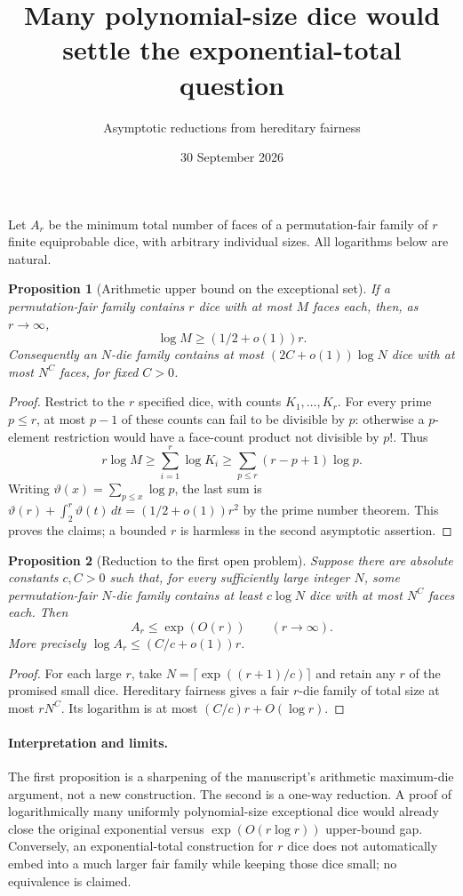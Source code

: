 \documentclass[11pt]{article}
\title{Many polynomial-size dice would settle the exponential-total question}
\author{Asymptotic reductions from hereditary fairness}
\date{30 September 2026}
\newtheorem{proposition}{Proposition}
\begin{document}
\maketitle
Let $A_r$ be the minimum total number of faces of a permutation-fair
family of $r$ finite equiprobable dice, with arbitrary individual sizes.
All logarithms below are natural.

\begin{proposition}[Arithmetic upper bound on the exceptional set]
If a permutation-fair family contains $r$ dice with at most $M$ faces
each, then, as $r\to\infty$,
\[
 \log M\ge(1/2+o(1))r.
\]
Consequently an $N$-die family contains at most
$(2C+o(1))\log N$ dice with at most $N^C$ faces, for fixed $C>0$.
\end{proposition}
\begin{proof}
Restrict to the $r$ specified dice, with counts $K_1,\ldots,K_r$.
For every prime $p\le r$, at most $p-1$ of these counts can fail to
be divisible by $p$: otherwise a $p$-element restriction would have
a face-count product not divisible by $p!$. Thus
\[
 r\log M\ge\sum_{i=1}^r\log K_i
 \ge\sum_{p\le r}(r-p+1)\log p.
\]
Writing $\vartheta(x)=\sum_{p\le x}\log p$, the last sum is
$\vartheta(r)+\int_2^r\vartheta(t)\,dt=(1/2+o(1))r^2$
by the prime number theorem. This proves the claims; a bounded $r$
is harmless in the second asymptotic assertion.
\end{proof}

\begin{proposition}[Reduction to the first open problem]\label{reduction}
Suppose there are absolute constants $c,C>0$ such that, for every
sufficiently large integer $N$, some permutation-fair $N$-die family
contains at least $c\log N$ dice with at most $N^C$ faces each.
Then
\[
 A_r\le\exp(O(r))\qquad(r\to\infty).
\]
More precisely $\log A_r\le(C/c+o(1))r$.
\end{proposition}
\begin{proof}
For each large $r$, take $N=\lceil\exp((r+1)/c)\rceil$ and retain
any $r$ of the promised small dice. Hereditary fairness gives a fair
$r$-die family of total size at most $rN^C$. Its logarithm is
at most $(C/c)r+O(\log r)$.
\end{proof}

\paragraph{Interpretation and limits.}
The first proposition is a sharpening of the manuscript's arithmetic
maximum-die argument, not a new construction. The second is a one-way
reduction. A proof of logarithmically many uniformly polynomial-size
exceptional dice would already close the original exponential versus
$\exp(O(r\log r))$ upper-bound gap. Conversely, an exponential-total
construction for $r$ dice does not automatically embed into a much larger
fair family while keeping those dice small; no equivalence is claimed.
\end{document}
